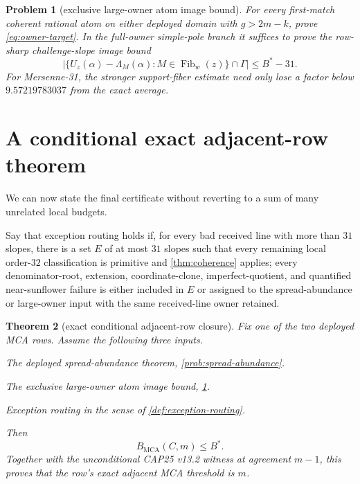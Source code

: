 \documentclass[11pt,a4paper]{amsart}
\numberwithin{equation}{section}
\newtheorem{theorem}{Theorem}[section]
\newtheorem{problem}[theorem]{Problem}
\theoremstyle{remark}
\newcommand{\Bbad}{B_{\mathrm{MCA}}}
\begin{document}
\begin{problem}[exclusive large-owner atom image bound]\label{prob:large-owner}
For every first-match coherent rational atom on either deployed domain with $g>2m-k$, prove \eqref{eq:owner-target}.  In the full-owner simple-pole branch it suffices to prove the row-sharp challenge-slope image bound
\[
 |\{U_z(\alpha)-\Lambda_M(\alpha):M\in\operatorname{Fib}_w(z)\}\cap\Gamma|
 \le B^*-31.
\]
For Mersenne-31, the stronger support-fiber estimate need only lose a factor below $9.57219783037$ from the exact average.
\end{problem}

\section{A conditional exact adjacent-row theorem}

We can now state the final certificate without reverting to a sum of many unrelated local budgets.

\begin{definition}\label{def:exception-routing}
Say that exception routing holds if, for every bad received line with more than $31$ slopes, there is a set $E$ of at most $31$ slopes such that every remaining local order-$32$ classification is primitive and \cref{thm:coherence} applies; every denominator-root, extension, coordinate-clone, imperfect-quotient, and quantified near-sunflower failure is either included in $E$ or assigned to the spread-abundance or large-owner input with the same received-line owner retained.
\end{definition}

\begin{theorem}[exact conditional adjacent-row closure]\label{thm:conditional-final}
Fix one of the two deployed MCA rows.  Assume the following three inputs.
\begin{description}[leftmargin=3.4em,labelwidth=2.6em,style=nextline]
\item[\textup{(S)}] The deployed spread-abundance theorem, \cref{prob:spread-abundance}.
\item[\textup{(A)}] The exclusive large-owner atom image bound, \cref{prob:large-owner}.
\item[\textup{(E)}] Exception routing in the sense of \cref{def:exception-routing}.
\end{description}
Then
\[
 \boxed{\Bbad(C,m)\le B^*.}
\]
Together with the unconditional CAP25 v13.2 witness at agreement $m-1$, this proves that the row's exact adjacent MCA threshold is $m$.
\end{theorem}
\end{document}

